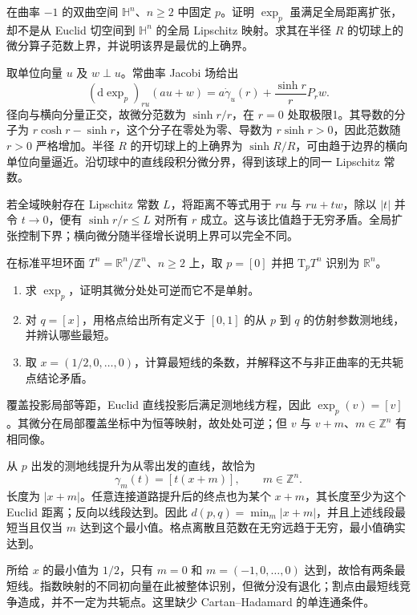 \begin{exercise}\label{g3:ex:hyperbolic-exp-unbounded}
	在曲率 \(-1\) 的双曲空间 \(\mathbb H^n\)、\(n\ge2\) 中固定 \(p\)。证明 \(\exp_p\) 虽满足全局距离扩张，却不是从 Euclid 切空间到 \(\mathbb H^n\) 的全局 Lipschitz 映射。求其在半径 \(R\) 的切球上的微分算子范数上界，并说明该界是最优的上确界。
\end{exercise}
\begin{solution}
	取单位向量 \(u\) 及 \(w\perp u\)。常曲率 Jacobi 场给出
	\[
		(\mathrm d\exp_p)_{ru}(au+w)
		=a\dot\gamma_u(r)+\frac{\sinh r}{r}P_rw.
	\]
	径向与横向分量正交，故微分范数为 \(\sinh r/r\)，在 \(r=0\) 处取极限1。其导数的分子为 \(r\cosh r-\sinh r\)，这个分子在零处为零、导数为 \(r\sinh r>0\)，因此范数随 \(r>0\) 严格增加。半径 \(R\) 的开切球上的上确界为 \(\sinh R/R\)，可由趋于边界的横向单位向量逼近。沿切球中的直线段积分微分界，得到该球上的同一 Lipschitz 常数。

	若全域映射存在 Lipschitz 常数 \(L\)，将距离不等式用于 \(ru\) 与 \(ru+tw\)，除以 \(|t|\) 并令 \(t\to0\)，便有 \(\sinh r/r\le L\) 对所有 \(r\) 成立。这与该比值趋于无穷矛盾。全局扩张控制下界；横向微分随半径增长说明上界可以完全不同。
\end{solution}

\begin{exercise}\label{g3:ex:flat-torus-exponential-cover}
	在标准平坦环面 \(T^n=\mathbb R^n/\mathbb Z^n\)、\(n\ge2\) 上，取 \(p=[0]\) 并把 \(\mathrm T_pT^n\) 识别为 \(\mathbb R^n\)。
	\begin{enumerate}
		\item 求 \(\exp_p\)，证明其微分处处可逆而它不是单射。
		\item 对 \(q=[x]\)，用格点给出所有定义于 \([0,1]\) 的从 \(p\) 到 \(q\) 的仿射参数测地线，并辨认哪些最短。
		\item 取 \(x=(1/2,0,\ldots,0)\)，计算最短线的条数，并解释这不与非正曲率的无共轭点结论矛盾。
	\end{enumerate}
\end{exercise}
\begin{solution}
	覆盖投影局部等距，Euclid 直线投影后满足测地线方程，因此
	\(\exp_p(v)=[v]\)。其微分在局部覆盖坐标中为恒等映射，故处处可逆；但 \(v\) 与 \(v+m\)、\(m\in\mathbb Z^n\) 有相同像。

	从 \(p\) 出发的测地线提升为从零出发的直线，故恰为
	\[
		\gamma_m(t)=[t(x+m)],\qquad m\in\mathbb Z^n.
	\]
	长度为 \(|x+m|\)。任意连接道路提升后的终点也为某个 \(x+m\)，其长度至少为这个 Euclid 距离；反向以线段达到。因此
	\(d(p,q)=\min_m|x+m|\)，并且上述线段最短当且仅当 \(m\) 达到这个最小值。格点离散且范数在无穷远趋于无穷，最小值确实达到。

	所给 \(x\) 的最小值为 \(1/2\)，只有 \(m=0\) 和 \(m=(-1,0,\ldots,0)\) 达到，故恰有两条最短线。指数映射的不同初向量在此被整体识别，但微分没有退化；割点由最短线竞争造成，并不一定为共轭点。这里缺少 Cartan--Hadamard 的单连通条件。
\end{solution}

